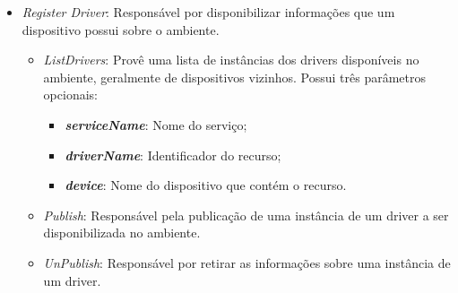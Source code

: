 \begin{itemize}
\begin{itemize}
		\item \emph{Register Driver}: Responsável por disponibilizar informações que um dispositivo possui sobre o ambiente.
			\begin{itemize}
				\item \emph{ListDrivers}: Provê uma lista de instâncias dos drivers disponíveis no ambiente, geralmente de dispositivos vizinhos. Possui três parâmetros opcionais:
					\begin{itemize}
						\item \emph{\bf{serviceName}}: Nome do serviço;
						\item \emph{\bf{driverName}}: Identificador do recurso;
						\item \emph{\bf{device}}: Nome do dispositivo que contém o recurso.
					\end{itemize}
				\item \emph{Publish}: Responsável pela publicação de uma instância de um driver a ser disponibilizada no ambiente.
				\item \emph{UnPublish}: Responsável por retirar as informações sobre uma instância de um driver.
			\end{itemize}
	\end{itemize}
\end{itemize}